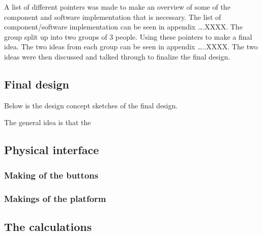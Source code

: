 \setlength{\parindent}{10ex}
A list of different pointers was made to make an overview of some of the component and software implementation that is necessary. 
The list of component/software implementation can be seen in appendix ….XXXX. 
The group split up into two groups of 3 people. Using these pointers to make a final idea. 
The two ideas from each group can be seen in appendix …..XXXX. 
The two ideas were then discussed and talked through to finalize the final design. 

\subsection{Final design}
Below is the design concept sketches of the final design. 

The general idea is that the 

\subsection{Physical interface}

\subsubsection{Making of the buttons}

\subsubsection{Makings of the platform}


\subsection{The calculations}






